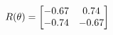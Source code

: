 \documentclass[preview]{standalone}
\begin{document}
\begin{align*}
\special{dvisvgm:raw <g id='unique000'>}R(\theta) = \begin{bmatrix}-0.67 & 0.74\\-0.74 & -0.67\end{bmatrix}\special{dvisvgm:raw </g>}
\end{align*}
\end{document}
